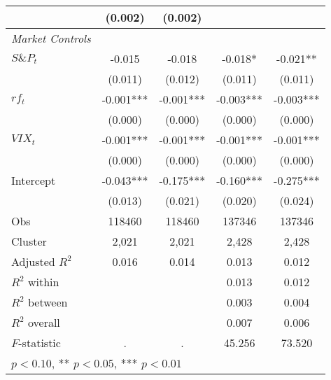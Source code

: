 {\begin{tabular}{l*{4}{c}}
            &     (0.002)   &     (0.002)   &               &               \\
\hline
\textit{Market Controls} & & & & \\
$S\&P_t$      &      -0.015   &      -0.018   &      -0.018*  &      -0.021** \\
            &     (0.011)   &     (0.012)   &     (0.011)   &     (0.011)   \\
$rf_{t}$       &      -0.001***&      -0.001***&      -0.003***&      -0.003***\\
            &     (0.000)   &     (0.000)   &     (0.000)   &     (0.000)   \\
$VIX_t$         &      -0.001***&      -0.001***&      -0.001***&      -0.001***\\
            &     (0.000)   &     (0.000)   &     (0.000)   &     (0.000)   \\
Intercept      &      -0.043***&      -0.175***&      -0.160***&      -0.275***\\
            &     (0.013)   &     (0.021)   &     (0.020)   &     (0.024)   \\
\hline
Obs       &      118460   &      118460   &      137346   &      137346   \\
Cluster     &       2,021   &       2,021   &       2,428   &       2,428   \\
Adjusted $R^2$       &       0.016   &       0.014   &       0.013   &       0.012   \\
$R^2$ within       &               &               &       0.013   &       0.012   \\
$R^2$ between        &               &               &       0.003   &       0.004   \\
$R^2$ overall        &               &               &       0.007   &       0.006   \\
$F$-statistic           &           .   &           .   &      45.256   &      73.520   \\
\hline\hline
\multicolumn{5}{l}{\footnotesize * \(p<0.10\), ** \(p<0.05\), *** \(p<0.01\)}\\
\end{tabular}
}
